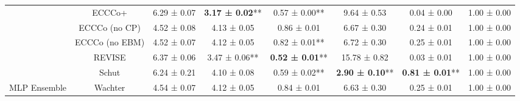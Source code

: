 \begin{table}
{\begin{tabular}[t]{cccccccc}
 & ECCCo+ & 6.29 ± 0.07\hphantom{*}\hphantom{*} & \textbf{3.17 ± 0.02}** & 0.57 ± 0.00** & 9.64 ± 0.53\hphantom{*}\hphantom{*} & 0.04 ± 0.00\hphantom{*}\hphantom{*} & 1.00 ± 0.00\hphantom{*}\hphantom{*}\\

 & ECCCo (no CP) & 4.52 ± 0.08\hphantom{*}\hphantom{*} & 4.13 ± 0.05\hphantom{*}\hphantom{*} & 0.86 ± 0.01\hphantom{*}\hphantom{*} & 6.67 ± 0.30\hphantom{*}\hphantom{*} & 0.24 ± 0.01\hphantom{*}\hphantom{*} & 1.00 ± 0.00\hphantom{*}\hphantom{*}\\

 & ECCCo (no EBM) & 4.52 ± 0.07\hphantom{*}\hphantom{*} & 4.12 ± 0.05\hphantom{*}\hphantom{*} & 0.82 ± 0.01** & 6.72 ± 0.30\hphantom{*}\hphantom{*} & 0.25 ± 0.01\hphantom{*}\hphantom{*} & 1.00 ± 0.00\hphantom{*}\hphantom{*}\\

 & REVISE & 6.37 ± 0.06\hphantom{*}\hphantom{*} & 3.47 ± 0.06** & \textbf{0.52 ± 0.01}** & 15.78 ± 0.82\hphantom{*}\hphantom{*} & 0.03 ± 0.01\hphantom{*}\hphantom{*} & 1.00 ± 0.00\hphantom{*}\hphantom{*}\\

 & Schut & 6.24 ± 0.21\hphantom{*}\hphantom{*} & 4.10 ± 0.08\hphantom{*}\hphantom{*} & 0.59 ± 0.02** & \textbf{2.90 ± 0.10}** & \textbf{0.81 ± 0.01}** & 1.00 ± 0.00\hphantom{*}\hphantom{*}\\

\multirow[t]{-10}{*}{\centering\arraybackslash MLP Ensemble} & Wachter & 4.54 ± 0.07\hphantom{*}\hphantom{*} & 4.12 ± 0.05\hphantom{*}\hphantom{*} & 0.84 ± 0.01\hphantom{*}\hphantom{*} & 6.63 ± 0.30\hphantom{*}\hphantom{*} & 0.25 ± 0.01\hphantom{*}\hphantom{*} & 1.00 ± 0.00\hphantom{*}\hphantom{*}\\
\bottomrule
\end{tabular}}
\end{table}
